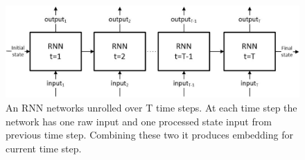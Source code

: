 \documentclass[10pt,twocolumn,letterpaper]{article}
\begin{document}
\begin{figure}[h]
	\begin{center}
		\includegraphics[width=\linewidth]{rnn_network2}
	\end{center}
	\caption{An RNN networks unrolled over T time steps. At each time step the network has one raw input and one processed state input from previous time step. Combining these two it produces embedding for current time step.}
	\label{fig:rnn_network}
\end{figure}
 

\end{document}
